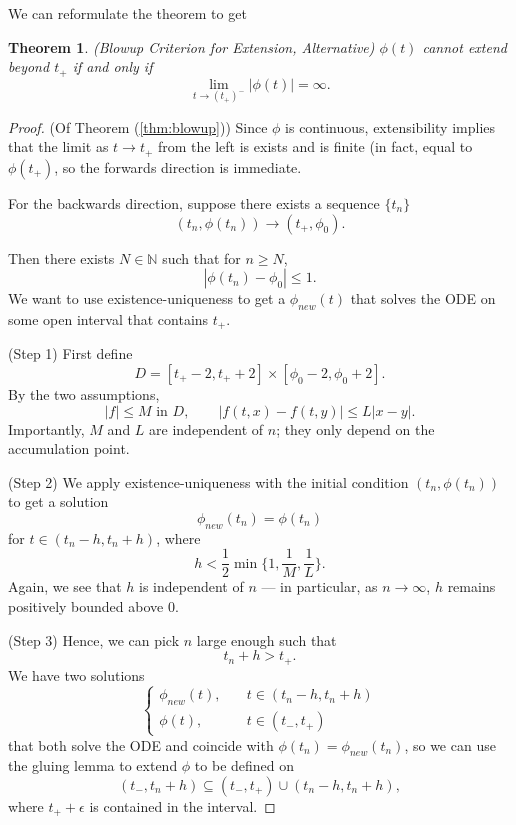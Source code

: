 \documentclass{tufte-handout}
\newcommand*\N{\mathbb{N}}
\newtheorem{thm}{Theorem}[subsection]
\theoremstyle{definition}
\begin{document}
We can reformulate the theorem to get 
\begin{thm}
	(Blowup Criterion for Extension, Alternative) $\phi(t)$ cannot extend beyond $t_+$ if and only if \[
		\lim\limits_{t \to \left( t_+ \right)^{-}} \left| \phi(t) \right| = \infty
	.\] 
\end{thm}

\begin{proof}
	(Of Theorem (\ref{thm:blowup})) Since $\phi$ is continuous, extensibility implies that the limit as $t \to t_+$ from the left is exists and is finite (in fact, equal to $\phi(t_+)$, so the forwards direction is immediate.

	For the backwards direction, suppose there exists a sequence $\{t_n\}$ \[
		\left( t_n, \phi(t_n) \right) \to (t_+, \phi_0)
	.\] 

	Then there exists $N \in \N$ such that for $n \ge N$, \[
		\left| \phi(t_n) - \phi_0 \right| \le 1
	.\] We want to use existence-uniqueness to get a $\phi_{new}(t)$ that solves the ODE on some open interval that contains $t_+$.

	(Step 1) First define \[
		D = \left[ t_+ -2, t_+ + 2 \right] \times \left[ \phi_0-2,\phi_0+2 \right] 
	.\] By the two assumptions, \[
		\left| f \right| \le M \text{ in } D, \qquad \left| f(t,x) - f(t,y) \right| \le L \left| x-y \right|
	.\] Importantly, $M$ and $L$ are independent of $n$; they only depend on the accumulation point. 

	(Step 2) We apply existence-uniqueness with the initial condition $(t_n, \phi(t_n))$ to get a solution \[
		\phi_{new}(t_n) = \phi(t_n)
	\] for $t \in (t_n -h, t_n+ h)$, where \[
		h < \frac{1}{2} \min \{1, \frac{1}{M}, \frac{1}{L}\}
	.\] Again, we see that $h$ is independent of $n$ --- in particular, as $n\to \infty$, $h$ remains positively bounded above $0$.

	(Step 3) Hence, we can pick $n$ large enough such that \[
		t_n + h > t_+
	.\] We have two solutions \[
		\begin{cases}
			\phi_{new}(t), \quad &t \in (t_n - h, t_n + h) \\
			\phi(t), \quad &t \in (t_-, t_+)
		\end{cases}
	\] that both solve the ODE and coincide with $\phi(t_n) = \phi_{new}(t_n)$, so we can use the gluing lemma to extend $\phi$ to be defined on \[
	(t_-, t_n+h) \subseteq \left( t_-, t_+ \right) \cup \left( t_n - h, t_n+ h \right)
	,\] where $t_+ + \epsilon$ is contained in the interval.
\end{proof}
\end{document}

